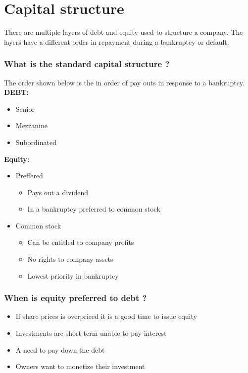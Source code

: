 \documentclass[11pt]{scrartcl} %
\begin{document}
\section{Capital structure}

There are multiple layers of debt and equity used to structure a company. The layers have a different order in repayment during a bankruptcy or default.

\subsubsection{What is the standard capital structure ?}

The order shown below is the in order of pay outs in response to a bankruptcy.\\

\textbf{DEBT:}

\begin{itemize}
	\item Senior
	\item Mezzanine
	\item Subordinated
\end{itemize}

\textbf{Equity:}

\begin{itemize}
	\item Preffered
	\begin{itemize}
		\item Pays out a dividend
		\item In a bankruptcy preferred to common stock
	\end{itemize}
	\item Common stock
	\begin{itemize}
		\item Can be entitled to company profits
		\item No rights to company assets
		\item Lowest priority in bankruptcy
	\end{itemize}
\end{itemize}

\subsubsection{When is equity preferred to debt ?}

\begin{itemize}
	\item If share prices is overpriced it is a good time to issue equity
	\item Investments are short term unable to pay interest
	\item A need to pay down the debt
	\item Owners want to monetize their investment
\end{itemize}
\end{document}
